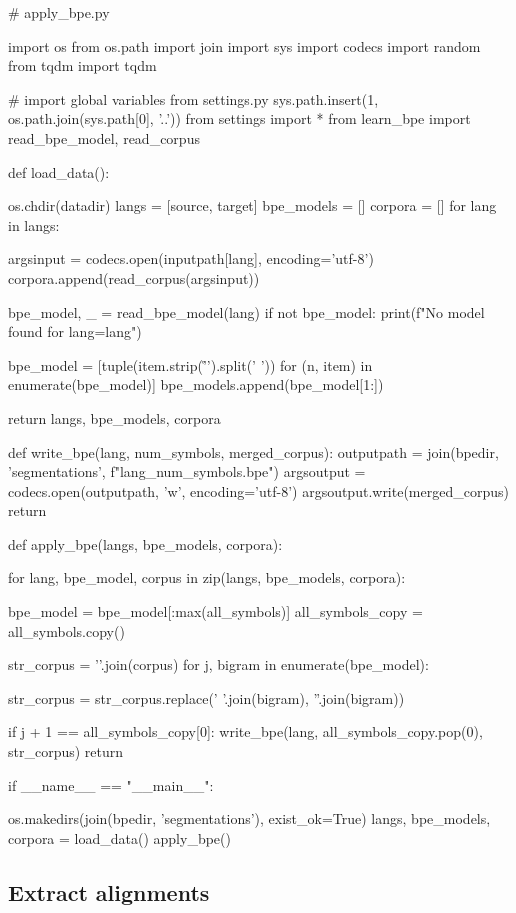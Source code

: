 \begin{python}
# apply_bpe.py

import os
from os.path import join
import sys
import codecs
import random
from tqdm import tqdm

# import global variables from settings.py
sys.path.insert(1, os.path.join(sys.path[0], '..'))
from settings import *
from learn_bpe import read_bpe_model, read_corpus

def load_data():

  os.chdir(datadir)
  langs = [source, target]
  bpe_models = []
  corpora = []
  for lang in langs:

    argsinput = codecs.open(inputpath[lang], encoding='utf-8')
    corpora.append(read_corpus(argsinput))

    bpe_model, _ = read_bpe_model(lang)
    if not bpe_model:
      print(f"No model found for lang={lang}")

    bpe_model = [tuple(item.strip('\r\n ').split(' ')) for (n, item) in enumerate(bpe_model)]
    bpe_models.append(bpe_model[1:])

  return langs, bpe_models, corpora

def write_bpe(lang, num_symbols, merged_corpus):
  outputpath = join(bpedir, 'segmentations', f"{lang}_{num_symbols}.bpe")
  argsoutput = codecs.open(outputpath, 'w', encoding='utf-8')
  argsoutput.write(merged_corpus)
  return

def apply_bpe(langs, bpe_models, corpora):
    
  for lang, bpe_model, corpus in zip(langs, bpe_models, corpora):

    bpe_model = bpe_model[:max(all_symbols)]
    all_symbols_copy = all_symbols.copy()

    str_corpus = '\n'.join(corpus)
    for j, bigram in enumerate(bpe_model):

      str_corpus = str_corpus.replace(' '.join(bigram), ''.join(bigram))

      if j + 1 == all_symbols_copy[0]:
        write_bpe(lang, all_symbols_copy.pop(0), str_corpus)
  return

if __name__ == "__main__":

  os.makedirs(join(bpedir, 'segmentations'), exist_ok=True)
  langs, bpe_models, corpora = load_data()
  apply_bpe()
\end{python}

\subsection{Extract alignments}

